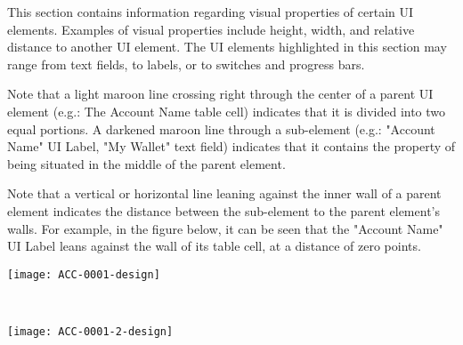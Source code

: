 
This section contains information regarding visual properties of certain UI elements. Examples of visual properties include height, width, and relative distance to another UI element. The UI elements highlighted in this section may range from text fields, to labels, or to switches and progress bars. \newline

Note that a light maroon line crossing right through the center of a parent UI element (e.g.: The Account Name table cell) indicates that it is divided into two equal portions. A darkened maroon line through a sub-element (e.g.: "Account Name" UI Label, "My Wallet" text field) indicates that it contains the property of being situated in the middle of the parent element. \newline

Note that a vertical or horizontal line leaning against the inner wall of a parent element indicates the distance between the sub-element to the parent element's walls. For example, in the figure below, it can be seen that the "Account Name" UI Label leans against the wall of its table cell, at a distance of zero points.

\centerline{\texttt{[image: ACC-0001-design]}}
~ \newline

\centerline{\texttt{[image: ACC-0001-2-design]}}